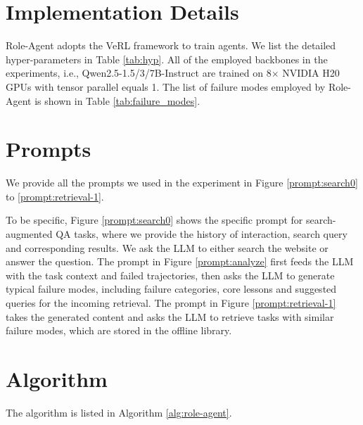 \documentclass{llmxive}
\begin{document}
\section{Implementation Details}\label{appx:c}
Role-Agent adopts the VeRL framework to train agents. We list the detailed hyper-parameters in Table \ref{tab:hyp}. All of the employed backbones in the experiments, i.e., Qwen2.5-1.5/3/7B-Instruct are trained on 8$\times$ NVIDIA H20 GPUs with tensor parallel equals 1. The list of failure modes employed by Role-Agent is shown in Table \ref{tab:failure_modes}.



\section{Prompts}
\label{appx:d}
We provide all the prompts we used in the experiment in Figure \ref{prompt:search0} to \ref{prompt:retrieval-1}. 

To be specific, Figure \ref{prompt:search0} shows the specific prompt for search-augmented QA tasks, where we provide the history of interaction, search query and corresponding results. We ask the LLM to either search the website or answer the question. The prompt in Figure \ref{prompt:analyze} first feeds the LLM with the task context and failed trajectories, then asks the LLM to generate typical failure modes, including failure categories, core lessons and suggested queries for the incoming retrieval. The prompt in Figure \ref{prompt:retrieval-1} takes the generated content and asks the LLM to retrieve tasks with similar failure modes, which are stored in the offline library.

\section{Algorithm}
The algorithm is listed in Algorithm \ref{alg:role-agent}.
\end{document}

